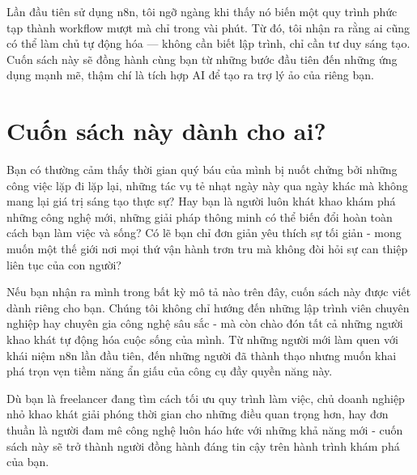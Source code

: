 \documentclass[a4paper,12pt,oneside]{book}
\begin{document}
Lần đầu tiên sử dụng n8n, tôi ngỡ ngàng khi thấy nó biến một quy trình phức tạp thành workflow mượt mà chỉ trong vài phút. Từ đó, tôi nhận ra rằng ai cũng có thể làm chủ tự động hóa — không cần biết lập trình, chỉ cần tư duy sáng tạo. Cuốn sách này sẽ đồng hành cùng bạn từ những bước đầu tiên đến những ứng dụng mạnh mẽ, thậm chí là tích hợp AI để tạo ra trợ lý ảo của riêng bạn.

\newpage

\section*{Cuốn sách này dành cho ai?}
\begin{center}
    
\end{center}

Bạn có thường cảm thấy thời gian quý báu của mình bị nuốt chửng bởi những công việc lặp đi lặp lại, những tác vụ tẻ nhạt ngày này qua ngày khác mà không mang lại giá trị sáng tạo thực sự? Hay bạn là người luôn khát khao khám phá những công nghệ mới, những giải pháp thông minh có thể biến đổi hoàn toàn cách bạn làm việc và sống? Có lẽ bạn chỉ đơn giản yêu thích sự tối giản - mong muốn một thế giới nơi mọi thứ vận hành trơn tru mà không đòi hỏi sự can thiệp liên tục của con người?

Nếu bạn nhận ra mình trong bất kỳ mô tả nào trên đây, cuốn sách này được viết dành riêng cho bạn.
Chúng tôi không chỉ hướng đến những lập trình viên chuyên nghiệp hay chuyên gia công nghệ sâu sắc - mà còn chào đón tất cả những người khao khát tự động hóa cuộc sống của mình. Từ những người mới làm quen với khái niệm n8n lần đầu tiên, đến những người đã thành thạo nhưng muốn khai phá trọn vẹn tiềm năng ẩn giấu của công cụ đầy quyền năng này.

Dù bạn là freelancer đang tìm cách tối ưu quy trình làm việc, chủ doanh nghiệp nhỏ khao khát giải phóng thời gian cho những điều quan trọng hơn, hay đơn thuần là người đam mê công nghệ luôn háo hức với những khả năng mới - cuốn sách này sẽ trở thành người đồng hành đáng tin cậy trên hành trình khám phá của bạn.
\end{document}
